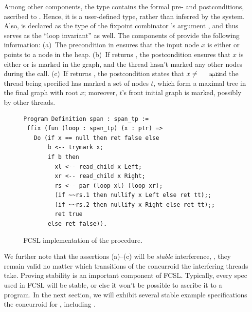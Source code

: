 Among other components, the type  contains the formal
pre- and postconditions, ascribed to . Hence, it is a
user-defined type, rather than inferred by the system. Also,
 is declared as the type of the fixpoint combinator
's argument , and thus serves as the ``loop
invariant'' as well. The components of  provide the
following information:
%
(a)~The precondition in  ensures that the input node
$x$ is either  or points to a node in the heap.
%
(b)~If  returns , the postcondition ensures
that $x$ is either  or is marked in the graph, and the
thread hasn't marked any other nodes during the call.
%
(c)~If  returns , the postcondition states that
$x \neq \text{\code{null}}$, and the thread being specified has marked
a set of nodes $t$, which form a maximal tree in the final graph with
root $x$; moreover, $t$'s front \wrt initial graph is marked, possibly
by other threads.


{
\setlength{\belowcaptionskip}{-10pt}
\begin{figure}[t!]
{\centering 
\begin{lstlisting}[basicstyle=\footnotesize\ttfamily]
Program Definition span : span_tp :=
 ffix (fun (loop : span_tp) (x : ptr) =>
   Do (if x == null then ret false else 
       b <-- trymark x;
       if b then
         xl <-- read_child x Left;
         xr <-- read_child x Right;
         rs <-- par (loop xl) (loop xr);
         (if ~~rs.1 then nullify x Left else ret tt);;
         (if ~~rs.2 then nullify x Right else ret tt);;
         ret true
       else ret false)). 
\end{lstlisting}
\vspace{-7pt}   
}
\caption{FCSL implementation of the  procedure.}
\label{fig:coq-span}
\end{figure}
}

We further note that the assertions (a)--(c) will be \emph{stable}
\wrt interference, \ie, they remain valid no matter which transitions
of the  concurroid the interfering threads take. 
%
%
Proving stability is an important component of FCSL. Typically, every
spec used in FCSL will be stable, or else it won't be possible to
ascribe it to a program. In the next section, we will exhibit several
stable example specifications \wrt the concurroid for ,
including .

